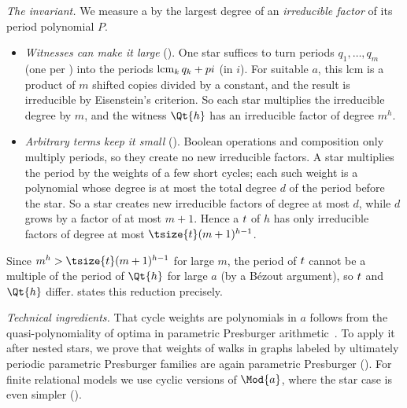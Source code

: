 \emph{The invariant.}
We measure a  by the largest degree of an \emph{irreducible factor} of its period polynomial $P$.
\begin{itemize}
    \item \emph{Witnesses can make it large} ().
          One star suffices to turn periods $q_1, \dots, q_m$ (one per ) into the periods $\operatorname{lcm}_k q_k + p i$ (in  $i$).
          For suitable $a$, this lcm is a product of $m$ shifted copies divided by a constant, and the result is irreducible by Eisenstein's criterion.
          So each star multiplies the irreducible degree by $m$, and the witness $\Qt{h}$ has an irreducible factor of degree $m^{h}$.
    \item \emph{Arbitrary terms keep it small} ().
          Boolean operations and composition only multiply periods, so they create no new irreducible factors.
          A star multiplies the period by the weights of a few short cycles; each such weight is a polynomial whose degree is at most the total degree $d$ of the period before the star.
          So a star creates new irreducible factors of degree at most $d$, while $d$ grows by a factor of at most $m + 1$.
          Hence a  $\term$ of  $h$ has only irreducible factors of degree at most $\tsize{\term} (m+1)^{h-1}$.
\end{itemize}
Since $m^{h} > \tsize{\term} (m+1)^{h-1}$ for large $m$, the period of $\term$ cannot be a multiple of the period of $\Qt{h}$ for large $a$ (by a B\'ezout argument), so $\term$ and $\Qt{h}$ differ.
 states this reduction precisely.

\emph{Technical ingredients.}
That cycle weights are polynomials in $a$ follows from the quasi-polynomiality of optima in parametric Presburger arithmetic~\cite{bogartParametricPresburgerArithmetic2017}.
To apply it after nested stars, we prove that weights of walks in graphs labeled by ultimately periodic parametric Presburger families are again parametric Presburger ().
For finite relational models we use cyclic versions of $\Mod{a}$, where the star case is even simpler ().

